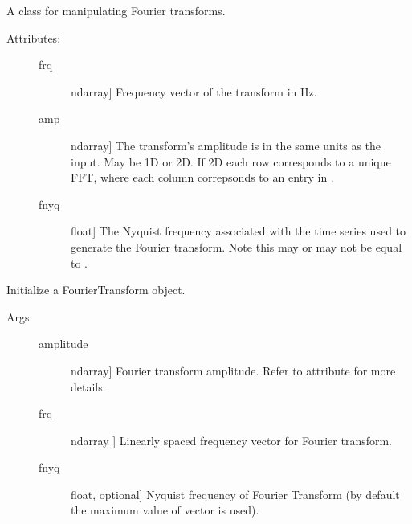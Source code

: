 \documentclass[letterpaper,10pt,english,openany,oneside]{sphinxmanual}
\begin{document}
\begin{fulllineitems}
\label{\detokenize{index:sigpropy.FourierTransform}}
A class for manipulating Fourier transforms.
\begin{description}
\item[{Attributes:}] \leavevmode\begin{description}
\item[{frq}] \leavevmode{[}ndarray{]}
Frequency vector of the transform in Hz.

\item[{amp}] \leavevmode{[}ndarray{]}
The transform’s amplitude is in the same units as the input.
May be 1D or 2D. If 2D each row corresponds to a unique FFT,
where each column correpsonds to an entry in .

\item[{fnyq}] \leavevmode{[}float{]}
The Nyquist frequency associated with the time series used
to generate the Fourier transform. Note this may or may not
be equal to .

\end{description}

\end{description}

\begin{fulllineitems}
\label{\detokenize{index:sigpropy.FourierTransform.__init__}}
Initialize a FourierTransform object.
\begin{description}
\item[{Args:}] \leavevmode\begin{description}
\item[{amplitude}] \leavevmode{[}ndarray{]}
Fourier transform amplitude. Refer to attribute 
for more details.

\item[{frq}] \leavevmode{[}ndarray {]}
Linearly spaced frequency vector for Fourier transform.

\item[{fnyq}] \leavevmode{[}float, optional{]}
Nyquist frequency of Fourier Transform (by default the
maximum value of  vector is used).


\end{description}
\end{description}
\end{fulllineitems}
\end{fulllineitems}
\end{document}
